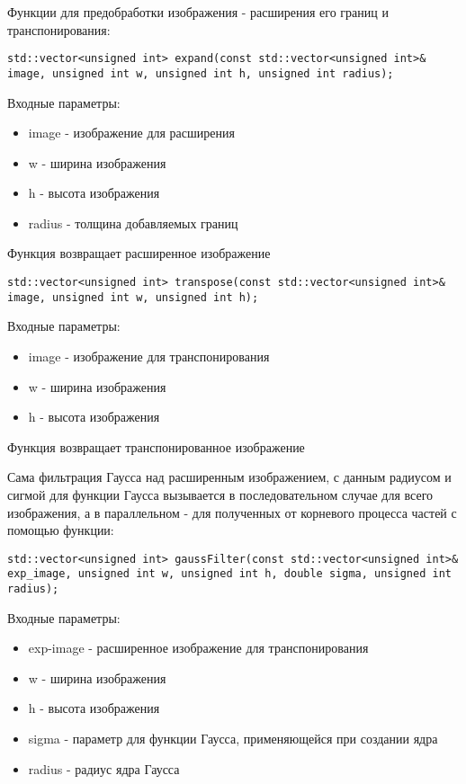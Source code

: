 \documentclass{report}
\begin{document}
\par Функции для предобработки изображения - расширения его границ и транспонирования:
\begin{lstlisting}
std::vector<unsigned int> expand(const std::vector<unsigned int>& image, unsigned int w, unsigned int h, unsigned int radius);
\end{lstlisting}
\par Входные параметры:
\begin{itemize}
\item image - изображение для расширения
\item w - ширина изображения
\item h - высота изображения
\item radius - толщина добавляемых границ
\end{itemize}

\par Функция возвращает расширенное изображение

\begin{lstlisting}
std::vector<unsigned int> transpose(const std::vector<unsigned int>& image, unsigned int w, unsigned int h);
\end{lstlisting}
\par Входные параметры:
\begin{itemize}
\item image - изображение для транспонирования
\item w - ширина изображения
\item h - высота изображения
\end{itemize}

\par Функция возвращает транспонированное изображение

\par Сама фильтрация Гаусса над расширенным изображением, с данным радиусом и сигмой для функции Гаусса вызывается в последовательном случае для всего изображения, а в параллельном - для полученных от корневого процесса частей с помощью функции:

\begin{lstlisting}
std::vector<unsigned int> gaussFilter(const std::vector<unsigned int>& exp_image, unsigned int w, unsigned int h, double sigma, unsigned int radius);
\end{lstlisting}
\par Входные параметры:
\begin{itemize}
\item exp-image - расширенное изображение для транспонирования
\item w - ширина изображения
\item h - высота изображения
\item sigma - параметр для функции Гаусса, применяющейся при создании ядра
\item radius - радиус ядра Гаусса
\end{itemize}
\end{document}
